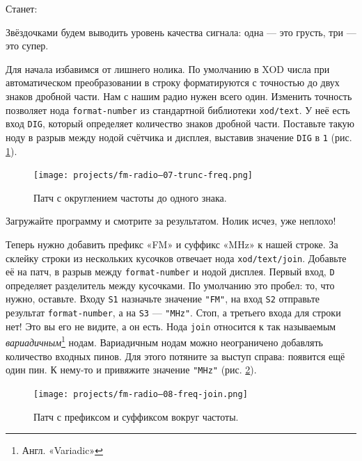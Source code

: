 \begin{labeling}{Станет:}
  \item [Было:] 
  \item [Станет:] 
\end{labeling}

Звёздочками будем выводить уровень качества сигнала: одна — это грусть, три — это супер.

Для начала избавимся от лишнего нолика. По умолчанию в XOD числа при автоматическом преобразовании в строку форматируются с точностью до двух знаков дробной части. Нам с нашим радио нужен всего один. Изменить точность позволяет нода \texttt{format-number} из стандартной библиотеки \texttt{xod/text}. У неё есть вход \texttt{DIG}, который определяет количество знаков дробной части. Поставьте такую ноду в разрыв между нодой счётчика и дисплея, выставив значение \texttt{DIG} в \texttt{1} (рис. \ref{patch:fm-format-number}).

\begin{figure}
  \centering
  \texttt{[image: projects/fm-radio--07-trunc-freq.png]}
  \caption{Патч с округлением частоты до одного знака.}
  \label{patch:fm-format-number}
\end{figure}

Загружайте программу и смотрите за результатом. Нолик исчез, уже неплохо!

Теперь нужно добавить префикс «FM» и суффикс «MHz» к нашей строке. За склейку строки из нескольких кусочков отвечает нода \texttt{xod/text/join}. Добавьте её на патч, в разрыв между \texttt{format-number} и нодой дисплея. Первый вход, \texttt{D} определяет разделитель между кусочками. По умолчанию это пробел: то, что нужно, оставьте. Входу \texttt{S1} назначьте значение \texttt{"FM"}, на вход \texttt{S2} отправьте результат \texttt{format-number}, а на \texttt{S3} — \texttt{"MHz"}. Стоп, а третьего входа для строки нет! Это вы его не видите, а он есть. Нода \texttt{join} относится к так называемым \emph{вариадичным}\footnote{Англ. «Variadic»} нодам. Вариадичным нодам можно неограничено добавлять количество входных пинов. Для этого потяните за выступ справа: появится ещё один пин. К нему-то и привяжите значение \texttt{"MHz"} (рис. \ref{patch:fm-join}).

\begin{figure}
  \centering
  \texttt{[image: projects/fm-radio--08-freq-join.png]}
  \caption{Патч с префиксом и суффиксом вокруг частоты.}
  \label{patch:fm-join}
\end{figure}

